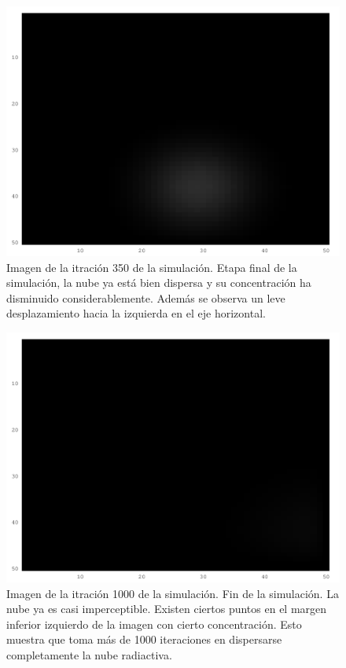 \documentclass[twocolumn,a4paper,10pt]{article}
\begin{document}
\begin{figure}[H]
        \includegraphics[width=\linewidth]{./images/iteration-350.png}
        \caption{Imagen de la itraci\'on 350 de la simulaci\'on. Etapa final de la simulaci\'on, la nube ya est\'a bien dispersa y su concentraci\'on ha 
        disminuido considerablemente. Adem\'as se observa un leve desplazamiento hacia la izquierda en el eje horizontal.}
        \label{fig:350-iteraciones}
\end{figure}

\begin{figure}[H]
        \includegraphics[width=\linewidth]{./images/iteration-1000.png}
        \caption{Imagen de la itraci\'on 1000 de la simulaci\'on. Fin de la simulaci\'on. La nube ya es casi imperceptible. Existen ciertos puntos en el margen 
        inferior izquierdo de la imagen con cierto concentraci\'on. Esto muestra que toma m\'as de 1000 iteraciones en dispersarse completamente la nube radiactiva.}
        \label{fig:1000-iteraciones}
\end{figure}
\end{document}
